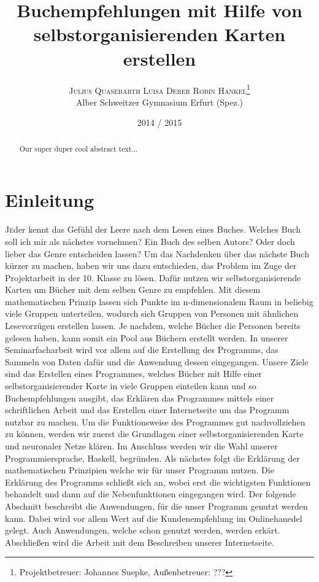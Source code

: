 \documentclass[twoside,a4paper,draft]{article}
\title{\vspace{-15mm}\fontsize{24pt}{10pt}\selectfont\bfseries{}Buchempfehlungen mit Hilfe von selbstorganisierenden Karten erstellen}
\author{\large\textsc{Julius Quasebarth \quad Luisa Derer \quad Robin Hankel}\thanks{Projektbetreuer: Johannes Suepke, Außenbetreuer: ???}\\[2mm]\normalsize Alber Schweitzer Gymnasium Erfurt (Spez.)\\\vspace{-5mm}}
\date{2014 / 2015}
\newcommand{\commonlettrine}[1]{\lettrine[nindent=0em,lines=2]{#1}}
\begin{document}
\maketitle

\thispagestyle{fancy}


\begin{otherlanguage}{english}
\begin{abstract}
\noindent
Our super duper cool abstract text...
\end{abstract}
\end{otherlanguage}

\tableofcontents

\section{Einleitung}

\commonlettrine{J}eder kennt das Gefühl der Leere nach dem Lesen eines Buches. Welches Buch soll ich mir als nächstes vornehmen? Ein Buch des selben Autors? Oder doch lieber das Genre entscheiden lassen?
Um das Nachdenken über das nächste Buch kürzer zu machen, haben wir uns dazu entschieden, das Problem im Zuge der Projektarbeit in der 10. Klasse zu lösen.
Dafür nutzen wir selbstorganisierende Karten um Bücher mit dem selben Genre zu empfehlen. Mit diesem mathematischen Prinzip lassen sich Punkte im n-dimensionalem Raum in beliebig viele Gruppen unterteilen, wodurch sich Gruppen von Personen mit ähnlichen Lesevorzügen erstellen lassen. Je nachdem, welche Bücher die Personen bereits gelesen haben, kann somit ein \glqq{}Pool\grqq{} aus Büchern erstellt werden. In unserer Seminarfacharbeit wird vor allem auf die Erstellung des Programms, das Sammeln von Daten dafür und die Anwendung dessen eingegangen. 
Unsere Ziele sind das Erstellen eines Programmes, welches Bücher mit Hilfe einer selbstorganisierender Karte in viele Gruppen einteilen kann und so Buchempfehlungen ausgibt, das Erklären das Programmes mittels einer schriftlichen Arbeit und das Erstellen einer Internetseite um das Programm nutzbar zu machen.
Um die Funktionsweise des Programmes gut nachvollziehen zu können, werden wir zuerst die Grundlagen einer selbstorganisierenden Karte und neuronaler Netze klären. Im Anschluss werden wir die Wahl unserer Programmiersprache, Haskell, begründen. Als nächstes folgt die Erklärung der mathematischen Prinzipien welche wir für unser Programm nutzen. Die Erklärung des Programms schließt sich an, wobei erst die wichtigsten Funktionen behandelt und dann auf die Nebenfunktionen eingegangen wird. Der folgende Abschnitt beschreibt die Anwendungen, für die unser Programm genutzt werden kann. Dabei wird vor allem Wert auf die Kundenempfehlung im Onlinehanedel gelegt. Auch Anwendungen, welche schon genutzt werden, werden erkärt. Abschließen wird die Arbeit mit dem Beschreiben unserer Internetseite.
\end{document}
